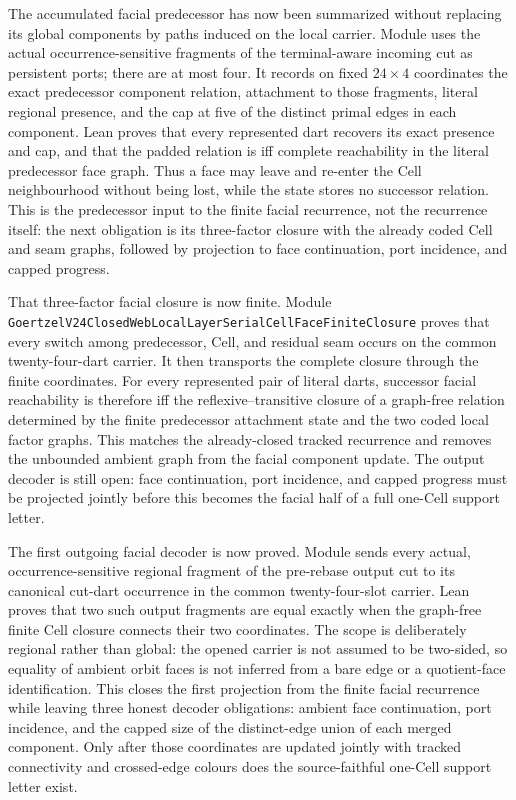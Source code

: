 \documentclass[11pt]{article}
\theoremstyle{definition}
\begin{document}
The accumulated facial predecessor has now been summarized without replacing
its global components by paths induced on the local carrier.  Module
uses the actual occurrence-sensitive fragments of the terminal-aware incoming
cut as persistent ports; there are at most four.  It records on fixed
$24\times4$ coordinates the exact predecessor component relation, attachment
to those fragments, literal regional presence, and the cap at five of the
distinct primal edges in each component.  Lean proves that every represented
dart recovers its exact presence and cap, and that the padded relation is iff
complete reachability in the literal predecessor face graph.  Thus a face may
leave and re-enter the Cell neighbourhood without being lost, while the state
stores no successor relation.  This is the predecessor input to the finite
facial recurrence, not the recurrence itself: the next obligation is its
three-factor closure with the already coded Cell and seam graphs, followed by
projection to face continuation, port incidence, and capped progress.

That three-factor facial closure is now finite.  Module
\texttt{GoertzelV24ClosedWebLocalLayerSerialCellFaceFiniteClosure} proves that
every switch among predecessor, Cell, and residual seam occurs on the common
twenty-four-dart carrier.  It then transports the complete closure through the
finite coordinates.  For every represented pair of literal darts, successor
facial reachability is therefore iff the reflexive--transitive closure of a
graph-free relation determined by the finite predecessor attachment state and
the two coded local factor graphs.  This matches the already-closed tracked
recurrence and removes the unbounded ambient graph from the facial component
update.  The output decoder is still open: face continuation, port incidence,
and capped progress must be projected jointly before this becomes the facial
half of a full one-Cell support letter.

The first outgoing facial decoder is now proved.  Module
sends every actual, occurrence-sensitive regional fragment of the pre-rebase
output cut to its canonical cut-dart occurrence in the common
twenty-four-slot carrier.  Lean proves that two such output fragments are
equal exactly when the graph-free finite Cell closure connects their two
coordinates.  The scope is deliberately regional rather than global: the
opened carrier is not assumed to be two-sided, so equality of ambient orbit
faces is not inferred from a bare edge or a quotient-face identification.
This closes the first projection from the finite facial recurrence while
leaving three honest decoder obligations: ambient face continuation, port
incidence, and the capped size of the distinct-edge union of each merged
component.  Only after those coordinates are updated jointly with tracked
connectivity and crossed-edge colours does the source-faithful one-Cell
support letter exist.
\end{document}
